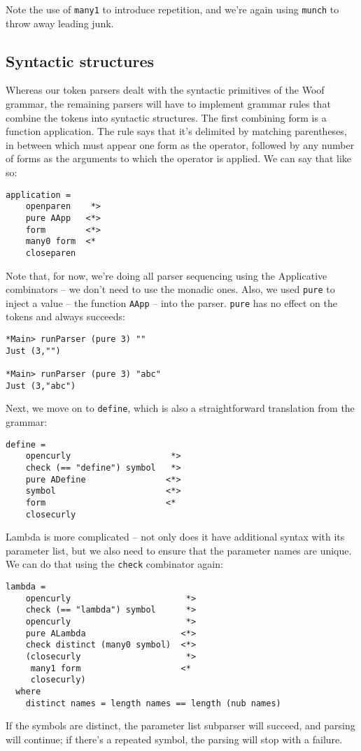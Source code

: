 \documentclass{tmr}
\begin{document}
Note the use of \verb+many1+ to introduce repetition,
and we're again using \verb+munch+ to throw away leading junk.

\subsection{Syntactic structures}
Whereas our token parsers dealt with the syntactic primitives of the Woof grammar, 
the remaining parsers will have to implement grammar rules that combine the tokens
into syntactic structures.
The first combining form is a function application.  The rule says that it's delimited
by matching parentheses, in between which must appear one form as the operator, followed
by any number of forms as the arguments to which the operator is applied.  We can
say that like so:
\begin{verbatim}
application =
    openparen    *>
    pure AApp   <*>
    form        <*>
    many0 form  <*
    closeparen
\end{verbatim}

Note that, for now, we're doing all parser sequencing using the Applicative
combinators -- we don't need to use the monadic ones.  Also, we used \verb+pure+ 
to inject a value -- the function \verb+AApp+ -- into the parser.  \verb+pure+ 
has no effect on the tokens and always succeeds:
\begin{verbatim}
*Main> runParser (pure 3) ""
Just (3,"")

*Main> runParser (pure 3) "abc"
Just (3,"abc")
\end{verbatim}

Next, we move on to \verb+define+, which is also a straightforward translation 
from the grammar:
\begin{verbatim}
define =
    opencurly                    *>
    check (== "define") symbol   *>
    pure ADefine                <*>
    symbol                      <*>
    form                        <*
    closecurly
\end{verbatim}

Lambda is more complicated -- not only does it have additional syntax with its parameter list,
but we also need to ensure that the parameter names are unique.  We can do that using the 
\verb+check+ combinator again:
\begin{verbatim}
lambda = 
    opencurly                       *>
    check (== "lambda") symbol      *>
    opencurly                       *>
    pure ALambda                   <*>
    check distinct (many0 symbol)  <*>
    (closecurly                     *>
     many1 form                    <*
     closecurly)
  where
    distinct names = length names == length (nub names)
\end{verbatim}
If the symbols are distinct, the parameter list subparser will succeed, and parsing will
continue; if there's a repeated symbol, the parsing will stop with a failure.
\end{document}
